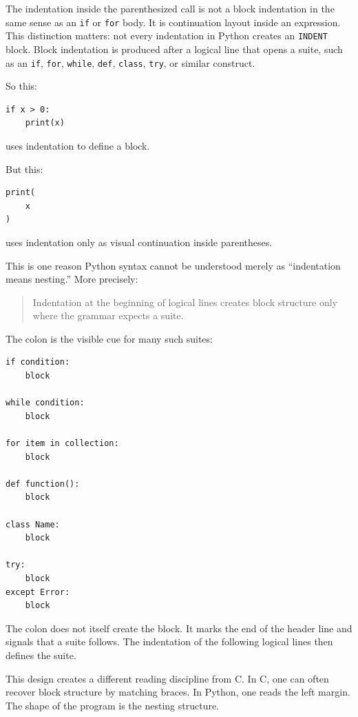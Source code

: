 The indentation inside the parenthesized call is not a block indentation in the same sense as an \texttt{if} or \texttt{for} body. It is continuation layout inside an expression. This distinction matters: not every indentation in Python creates an \texttt{INDENT} block. Block indentation is produced after a logical line that opens a suite, such as an \texttt{if}, \texttt{for}, \texttt{while}, \texttt{def}, \texttt{class}, \texttt{try}, or similar construct.

So this:

\begin{verbatim}
if x > 0:
    print(x)
\end{verbatim}

uses indentation to define a block.

But this:

\begin{verbatim}
print(
    x
)
\end{verbatim}

uses indentation only as visual continuation inside parentheses.

This is one reason Python syntax cannot be understood merely as ``indentation means nesting.'' More precisely:

\begin{quote}
Indentation at the beginning of logical lines creates block structure only where the grammar expects a suite.
\end{quote}

The colon is the visible cue for many such suites:

\begin{verbatim}
if condition:
    block

while condition:
    block

for item in collection:
    block

def function():
    block

class Name:
    block

try:
    block
except Error:
    block
\end{verbatim}

The colon does not itself create the block. It marks the end of the header line and signals that a suite follows. The indentation of the following logical lines then defines the suite.

This design creates a different reading discipline from C. In C, one can often recover block structure by matching braces. In Python, one reads the left margin. The shape of the program is the nesting structure.

